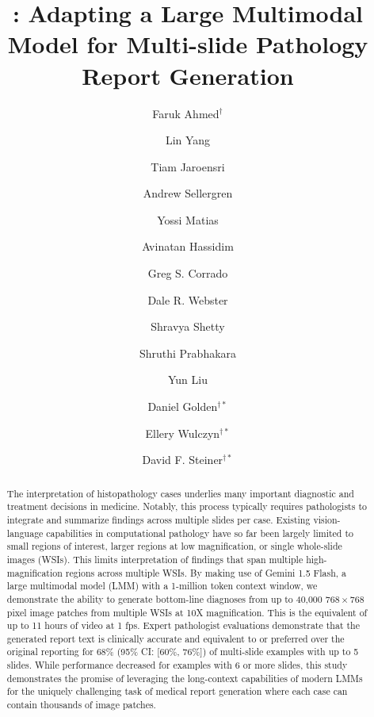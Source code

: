 \documentclass[11pt]{article}
\title{\textbf{\ourmodel: Adapting a Large Multimodal Model for Multi-slide Pathology Report Generation}}
\author{Faruk Ahmed$^\dagger$}
\author{Lin Yang}
\author{Tiam Jaroensri}
\author{Andrew Sellergren}
\author{Yossi Matias}
\author{\authorcr Avinatan Hassidim}
\author{Greg S. Corrado}
\author{Dale R. Webster}
\author{Shravya Shetty}
\author{\authorcr Shruthi Prabhakara}
\author{Yun Liu}
\author{Daniel Golden$^{\dagger *}$}
\author{Ellery Wulczyn$^{\dagger *}$}
\author{David F. Steiner$^{\dagger *}$}
\affil{\small Google Research}
\date{}
\begin{document}
\maketitle

\renewcommand*{\thefootnote}{\fnsymbol{footnote}}
\raggedbottom

\begin{abstract}
The interpretation of histopathology cases underlies many important diagnostic and treatment decisions in medicine. Notably, this process typically requires pathologists to integrate and summarize findings across multiple slides per case. Existing vision-language capabilities in computational pathology have so far been largely limited to small regions of interest, larger regions at low magnification, or single whole-slide images (WSIs). This limits interpretation of findings that span multiple high-magnification regions across multiple WSIs. By making use of Gemini 1.5 Flash, a large multimodal model (LMM) with a 1-million token context window, we demonstrate the ability to generate bottom-line diagnoses from up to 40,000 $768 \times 768$ pixel image patches from multiple WSIs at 10X magnification. This is the equivalent of up to 11 hours of video at 1 fps. Expert pathologist evaluations demonstrate that the generated report text is clinically accurate and equivalent to or preferred over the original reporting for 68\% (95\% CI: [60\%, 76\%]) of multi-slide examples with up to 5 slides. While performance decreased for examples with 6 or more slides, this study demonstrates the promise of leveraging the long-context capabilities of modern LMMs for the uniquely challenging task of medical report generation where each case can contain thousands of image patches.
\end{abstract}
\end{document}

